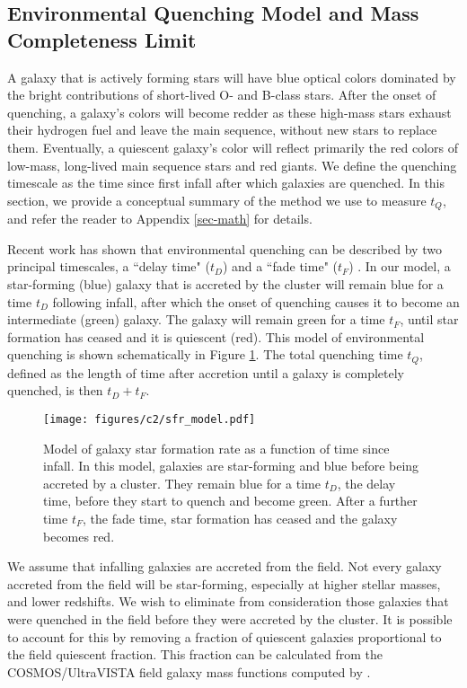 \subsection{Environmental Quenching Model and Mass Completeness Limit}\label{sec-model}

A galaxy that is actively forming stars will have blue optical colors dominated by the bright contributions of short-lived O- and B-class stars.
After the onset of quenching, a galaxy's colors will become redder as these high-mass stars exhaust their hydrogen fuel and leave the main sequence, without new stars to replace them.
Eventually, a quiescent galaxy's color will reflect primarily the red colors of low-mass, long-lived main sequence stars and red giants.
We define the  quenching timescale as the time since first infall after which galaxies are quenched.
In this section, we provide a conceptual summary of the method we use to measure $t_Q$, and refer the reader to Appendix \ref{sec-math} for details.

Recent work has shown that environmental quenching can be described by two principal timescales, a ``delay time" ($t_D$) and a ``fade time" ($t_F$) \citep{Wetzel:2013aa, McGee:2014aa, Mok:2014aa, Haines:2015aa, Balogh:2016aa, Fossati:2017aa}.
In our model, a star-forming (blue) galaxy that is accreted by the cluster will remain blue for a time $t_D$ following infall, after which the onset of quenching causes it to become an intermediate (green) galaxy.
The galaxy will remain green for a time $t_F$, until star formation has ceased and it is quiescent (red).
This model of environmental quenching is shown schematically in Figure \ref{fig-sfr}.
The total quenching time $t_Q$, defined as the length of time after accretion until a galaxy is completely quenched, is then $t_D + t_F$.

\begin{figure}[h!]
\centering \texttt{[image: figures/c2/sfr\_model.pdf]}
\caption[Toy model of star formation history for a quenched galaxy]{Model of galaxy star formation rate as a function of time since infall. In this model, galaxies are star-forming and blue before being accreted by a cluster. They remain blue for a time $t_D$, the delay time, before they start to quench and become green. After a further time $t_F$, the fade time, star formation has ceased and the galaxy becomes red.
\label{fig-sfr}}
\end{figure}

We assume that infalling galaxies are accreted from the field.
Not every galaxy accreted from the field will be star-forming, especially at higher stellar masses, and lower redshifts.
We wish to eliminate from consideration those galaxies that were quenched in the field before they were accreted by the cluster.
It is possible to account for this by removing a fraction of quiescent galaxies proportional to the field quiescent fraction.
This fraction can be calculated from the COSMOS/UltraVISTA field galaxy mass functions computed by \citet{Muzzin:2013ab}.

